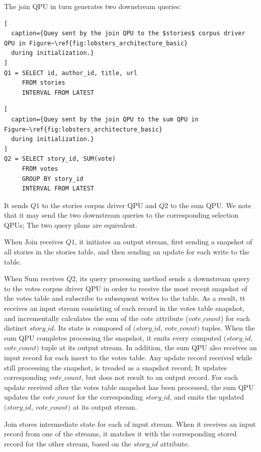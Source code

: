 \noindent
The join QPU in turn generates two downstream queries:

\begin{lstlisting}[
  caption={Quey sent by the join QPU to the $stories$ corpus driver QPU in Figure~\ref{fig:lobsters_architecture_basic}
  during initialization.}
]
Q1 = SELECT id, author_id, title, url
     FROM stories
     INTERVAL FROM LATEST
\end{lstlisting}

\begin{lstlisting}[
  caption={Quey sent by the join QPU to the sum QPU in Figure~\ref{fig:lobsters_architecture_basic}
  during initialization.}
]
Q2 = SELECT story_id, SUM(vote)
     FROM votes
     GROUP BY story_id
     INTERVAL FROM LATEST
\end{lstlisting}

\noindent
It sends $Q1$ to the stories corpus driver QPU and $Q2$ to the sum QPU.
We note that it may send the two downstream queries to the corresponding selection QPUs;
The two query plans are equivalent.

When Join receives $Q1$, it initiates an output stream,
first sending a snapshot of all stories in the stories table,
and then sending an update for each write to the table.

When Sum receives $Q2$, its query processing method sends a downstream query to the votes corpus driver QPU
in order to receive the most recent snapshot of the votes table and subscribe to subsequent writes to the table.
As a result, tt receives an input stream consisting of each record in the votes table snapshot,
and incrementally calculates the sum of the $vote$ attribute ($vote\_count$) for each distinct $story\_id$.
Its state is composed of $(story\_id$, $vote\_count)$ tuples.
When the sum QPU completes processing the snapshot, it emits every computed $(story\_id$, $vote\_count)$ tuple
at its output stream.
In addition, the sum QPU also receives an input record for each insert to the votes table.
Any update record received while still processing the snapshot, is treaded as a snapshot record;
It updates corresponding $vote\_count$, but does not result to an output record.
For each update received after the votes table snapshot has been processed,
the sum QPU updates the $vote\_count$ for the corresponding $story\_id$,
and emits the updated $(story\_id$, $vote\_count)$ at its output stream.

Join stores intermediate state for each of input stream.
When it receives an input record from one of the streams,
it matches it with the corresponding stored record for the other stream,
based on the $story\_id$ attribute.

